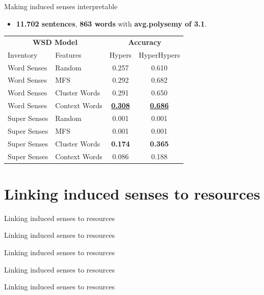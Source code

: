 \documentclass[usenames,dvipsnames]{beamer}
\begin{document}
\begin{frame}{ Making induced senses interpretable }
	
	
\vspace{-1em}
	
\begin{itemize}
	\item \textbf{11.702 sentences}, \textbf{863 words} with \textbf{avg.polysemy of 3.1}.   
\end{itemize}  

\begin{center}
	
\begin{tabular}{llcc}

\multicolumn{2}{c}{\bf WSD Model} & \multicolumn{2}{c}{\bf Accuracy}  \\
Inventory & Features & Hypers &  HyperHypers  \\ \toprule

Word Senses & Random  & 0.257 & 0.610 \\
Word Senses & MFS  & 0.292 & 0.682 \\
Word Senses & Cluster Words & 0.291 & 0.650 \\
Word Senses & Context Words & \underline{\textbf{0.308}} & \underline{\textbf{0.686}} \\
\hline \pause
Super Senses & Random & 0.001 & 0.001 \\
Super Senses & MFS & 0.001 & 0.001 \\
Super Senses & Cluster Words & \textbf{0.174} & \textbf{0.365} \\
Super Senses & Context Words & 0.086 & 0.188 \\

\end{tabular}

\end{center}
	
\end{frame}


\section{Linking induced senses to resources}

\begin{frame}{ Linking induced senses to resources }
	
\end{frame}


\begin{frame}{ Linking induced senses to resources }
	
\end{frame}


\begin{frame}{ Linking induced senses to resources }
	
\end{frame}


\begin{frame}{ Linking induced senses to resources }
	
\end{frame}


\begin{frame}{ Linking induced senses to resources }
	
\end{frame}

% 



\end{document}
